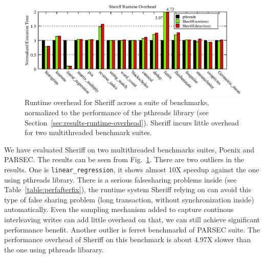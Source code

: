 \begin{figure}[!t]
\centering
\includegraphics[width=6in]{sheriff/figure/performance}
\caption{Runtime overhead for Sheriff across a suite of benchmarks,
  normalized to the performance of the pthreads library (see
  Section~\ref{sec:results-runtime-overhead}). Sheriff incurs little
  overhead for two multithreaded benchmark suites.
\label{fig:overhead}}
\end{figure}
We have evaluated Sheriff on two multithreaded benchmarks suites, Poenix and PARSEC. 
The results can be seen from Fig.~\ref{fig:overhead}. 
There are two outliers in the results. One is \texttt{linear\_regression}, 
it shows almost 10X speedup against the one using pthreads library. 
There is a serious falsesharing problems inside (see Table~\ref{table:perfafterfix}), the runtime system
Sheriff relying on can avoid this type of false sharing problem (long transaction, without synchronization inside)
automatically. Even the sampling mechanism added to capture continous interleaving writes can add little overhead
on that, we can still achieve significant performance benefit. 
Another outlier is ferret benchmarkd of PARSEC suite. The performance overhead of Sheriff on this benchmark
is about 4.97X slower than the one using pthreads libarary. 

